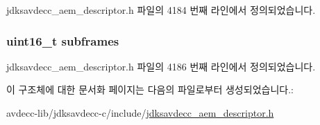 jdksavdecc\+\_\+aem\+\_\+descriptor.\+h 파일의 4184 번째 라인에서 정의되었습니다.

\subsubsection[{\texorpdfstring{subframes}{subframes}}]{\setlength{\rightskip}{0pt plus 5cm}uint16\+\_\+t subframes}\hypertarget{structjdksavdecc__values__smpte__time_a8f5ca74703be041d4572e5ae886bd487}{}\label{structjdksavdecc__values__smpte__time_a8f5ca74703be041d4572e5ae886bd487}


jdksavdecc\+\_\+aem\+\_\+descriptor.\+h 파일의 4186 번째 라인에서 정의되었습니다.



이 구조체에 대한 문서화 페이지는 다음의 파일로부터 생성되었습니다.\+:\begin{DoxyCompactItemize}
\item 
avdecc-\/lib/jdksavdecc-\/c/include/\hyperlink{jdksavdecc__aem__descriptor_8h}{jdksavdecc\+\_\+aem\+\_\+descriptor.\+h}\end{DoxyCompactItemize}
